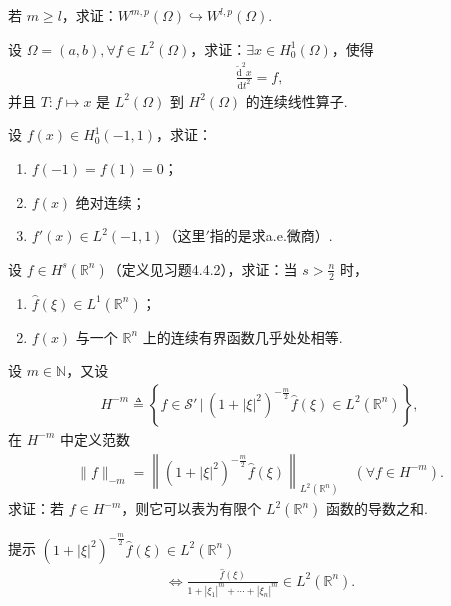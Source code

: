 \documentclass[../../main.tex]{subfiles}%
\begin{document}
\begin{example}
若 $m\geqslant l$，求证：$W^{m,p}(\Omega)\hookrightarrow W^{l,p}(\Omega)$.
\end{example}

\begin{example}
设 $\Omega=(a,b),\forall f\in L^2(\Omega)$，求证：$\exists x\in H_0^1(\Omega)$，使得
\begin{align*}
\frac{\widetilde{\mathrm{d}}^2x}{\mathrm{d}t^2}=f,
\end{align*}
并且 $T:f\mapsto x$ 是 $L^2(\Omega)$ 到 $H^2(\Omega)$ 的连续线性算子.
\end{example}

\begin{example}
设 $f(x)\in H_0^1(-1,1)$，求证：
\begin{enumerate}[(1)]
\item $f(-1)=f(1)=0$；
\item $f(x)$ 绝对连续；
\item $f'(x)\in L^2(-1,1)$（这里$'$指的是求a.e.微商）.
\end{enumerate}
\end{example}

\begin{example}
设 $f\in H^s(\mathbb{R}^n)$（定义见习题4.4.2），求证：当 $s>\frac{n}{2}$ 时，
\begin{enumerate}[(1)]
\item $\widehat{f}(\xi)\in L^1(\mathbb{R}^n)$；
\item $f(x)$ 与一个 $\mathbb{R}^n$ 上的连续有界函数几乎处处相等.
\end{enumerate}
\end{example}

\begin{example}
设 $m\in\mathbb{N}$，又设
\begin{align*}
H^{-m}\triangleq\left\{f\in\mathscr{S}'\,\bigg|\,(1+|\xi|^2)^{-\frac{m}{2}}\widehat{f}(\xi)\in L^2(\mathbb{R}^n)\right\},
\end{align*}
在 $H^{-m}$ 中定义范数
\begin{align*}
\|f\|_{-m}=\left\|(1+|\xi|^2)^{-\frac{m}{2}}\widehat{f}(\xi)\right\|_{L^2(\mathbb{R}^n)}\quad(\forall f\in H^{-m}).
\end{align*}
求证：若 $f\in H^{-m}$，则它可以表为有限个 $L^2(\mathbb{R}^n)$ 函数的导数之和.
\end{example}
\begin{note}
提示 $(1+|\xi|^2)^{-\frac{m}{2}}\widehat{f}(\xi)\in L^2(\mathbb{R}^n)$
\begin{align*}
\iff \frac{\widehat{f}(\xi)}{1+|\xi_1|^m+\cdots+|\xi_n|^m}\in L^2(\mathbb{R}^n).
\end{align*}
\end{note}
\end{document}
